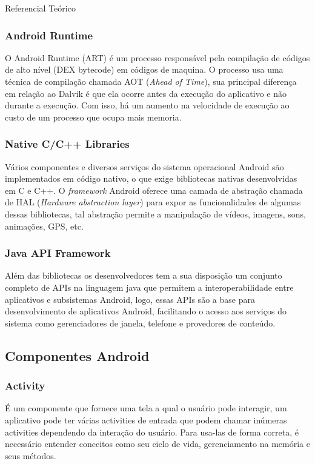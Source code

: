 \documentclass[
	12pt,				%
	openright,			%
	twoside,			%
	a4paper,			%
	english,			%
	french,				%
	spanish,			%
	brazil				%
	]{abntex2}
\begin{document}
\begin{chapter}{Referencial Teórico}
\subsubsection{Android Runtime}
O Android Runtime (ART) é um processo responsável pela compilação de códigos de alto nível (DEX bytecode) em códigos de maquina.
O processo usa uma técnica de compilação chamada AOT (\textit{Ahead of Time}), sua principal diferença em relação ao Dalvik é que ela ocorre antes 
da execução do aplicativo e não durante a execução. Com isso, há um aumento na velocidade de execução ao custo de um processo que ocupa mais memoria.

\subsubsection{Native C/C++ Libraries}
Vários componentes e diversos serviços do sistema operacional Android são implementados em código nativo,
 o que exige bibliotecas nativas desenvolvidas em C e C++.
O \textit{framework} Android oferece uma camada de abstração chamada de HAL (\textit{Hardware abstraction layer}) para expor as funcionalidades de algumas dessas bibliotecas,
 tal abstração permite a manipulação de vídeos, imagens, sons, animações, GPS, etc.

\subsubsection{Java API Framework}
Além das bibliotecas os desenvolvedores tem a sua disposição um conjunto completo de APIs na linguagem java que permitem a interoperabilidade entre aplicativos e subsistemas Android, logo, essas APIs são a base para desenvolvimento de aplicativos Android, facilitando o acesso aos serviços do sistema como gerenciadores de janela, telefone e provedores de conteúdo.

\subsection{Componentes Android}
\subsubsection{Activity}  \label{activity}
É um componente que fornece uma tela a qual o usuário pode interagir, um aplicativo pode ter várias activities de entrada que podem chamar inúmeras activities dependendo da interação do usuário. Para usa-las de forma correta, é necessário entender conceitos como seu ciclo de vida, gerenciamento na memória e seus métodos. 


\end{chapter}
\end{document}
